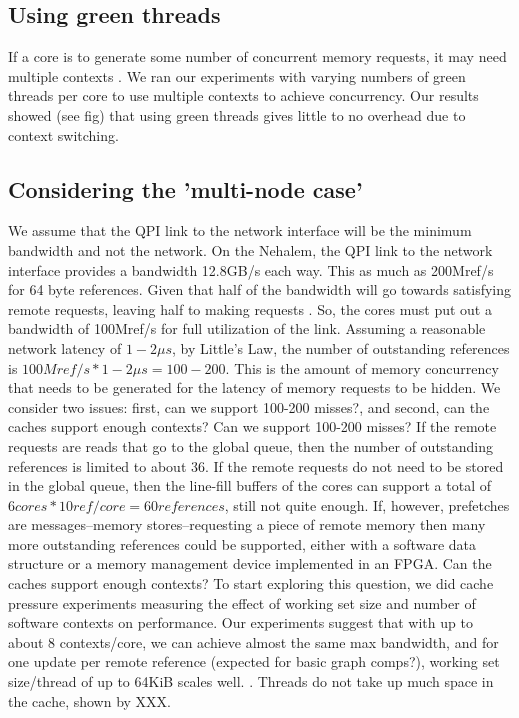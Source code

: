 \subsection{Using green threads}
	If a core is to generate some number of concurrent memory requests, it may need multiple contexts .  We ran our experiments with varying numbers of green threads per core to use multiple contexts to achieve concurrency. Our results showed (see fig) that using green threads gives little to no overhead due to context switching. 

\subsection{Considering the 'multi-node case'}
	We assume that the QPI link to the network interface will be the minimum bandwidth and not the network. On the Nehalem, the QPI link to the network interface provides a bandwidth 12.8GB/s each way. This as much as 200Mref/s for 64 byte references. Given that half of the bandwidth will go towards satisfying remote requests, leaving half to making requests .  So, the cores must put out a bandwidth of 100Mref/s for full utilization of the link.  Assuming a reasonable network latency of $1-2\mu s$, by Little's Law, the number of outstanding references is $100Mref/s*1-2\mu s = 100-200$. This is the amount of memory concurrency that needs to be generated for the latency of memory requests to be hidden.
We consider two issues: first, can we support 100-200 misses?, and second, can the caches support enough contexts? 
	Can we support 100-200 misses? If the remote requests are reads that go to the global queue, then the number of outstanding references is limited to about 36. If the remote requests do not need to be stored in the global queue, then the line-fill buffers of the cores can support a total of $6 cores * 10 ref/core = 60 references$, still not quite enough. If, however, prefetches are messages--memory stores--requesting a piece of remote memory then many more outstanding references could be supported, either with a software data structure or a memory management device implemented in an FPGA.
	Can the caches support enough contexts? To start exploring this question, we did cache pressure experiments measuring the effect of working set size and number of software contexts on performance. Our experiments suggest that with up to about 8 contexts/core, we can achieve almost the same max bandwidth, and for one update per remote reference (expected for basic graph comps?), working set size/thread of up to 64KiB scales well. .  Threads do not take up much space in the cache, shown by XXX.



